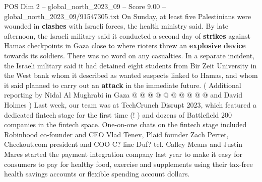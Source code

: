 \begin{textsample}{POS Dim 2 – global\_north\_2023\_09 – Score 9.00 – global\_north\_2023\_09/91547305.txt}
On Sunday, at least five Palestinians were wounded in \textbf{clashes} with Israeli forces, the health ministry said.
By late afternoon, the Israeli military said it conducted a second day of \textbf{strikes} against Hamas checkpoints in Gaza close to where rioters threw an \textbf{explosive} \textbf{device} towards its soldiers.
There was no word on any casualties.
In a separate incident, the Israeli military said it had detained eight students from Bir Zeit University in the West bank whom it described as wanted suspects linked to Hamas, and whom it said planned to carry out an \textbf{attack} in the immediate future. ( Additional reporting by Nidal Al Mughrabi in Gaza @ @ @ @ @ @ @ @ @ @ and David Holmes ) Last week, our team was at TechCrunch Disrupt 2023, which featured a dedicated fintech stage for the first time (! ) and dozens of Battlefield 200 companies in the fintech space.
One-on-one chats on the fintech stage included Robinhood co-founder and CEO Vlad Tenev, Plaid founder Zach Perret, Checkout.com president and COO C? line Duf? tel.
Calley Means and Justin Mares started the payment integration company last year to make it easy for consumers to pay for healthy food, exercise and supplements using their tax-free health savings accounts or flexible spending account dollars.

\end{textsample}
